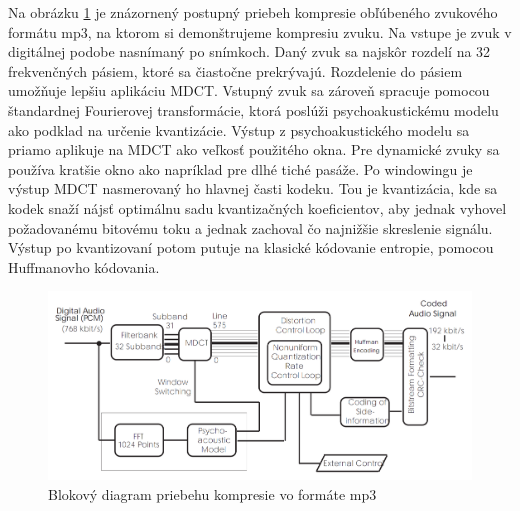 Na obrázku \ref{fig:mp3_flow_diagram} je znázornený postupný priebeh
kompresie obľúbeného zvukového formátu mp3, na ktorom si demonštrujeme
kompresiu zvuku. Na vstupe je zvuk v digitálnej podobe nasnímaný po
snímkoch. Daný zvuk sa najskôr rozdelí na 32 frekvenčných pásiem,
ktoré sa čiastočne prekrývajú. Rozdelenie do pásiem umožňuje lepšiu
aplikáciu MDCT. Vstupný zvuk sa zároveň spracuje pomocou štandardnej
Fourierovej transformácie, ktorá poslúži psychoakustickému modelu ako
podklad na určenie kvantizácie. Výstup z psychoakustického modelu sa
priamo aplikuje na MDCT ako veľkosť použitého okna. Pre dynamické
zvuky sa používa kratšie okno ako napríklad pre dlhé tiché pasáže.
Po windowingu je výstup MDCT nasmerovaný ho hlavnej časti kodeku.
Tou je kvantizácia, kde sa kodek snaží nájsť optimálnu sadu
kvantizačných koeficientov, aby jednak vyhovel požadovanému bitovému
toku a jednak zachoval čo najnižšie skreslenie signálu. Výstup po
kvantizovaní potom putuje na klasické kódovanie entropie, pomocou
Huffmanovho kódovania.

\begin{figure}[htp]
    \centering
    \includegraphics{obrazky/informatika/audio/mp3_flow_diagram}
    \caption{Blokový diagram priebehu kompresie vo formáte mp3}
    \label{fig:mp3_flow_diagram}
\end{figure}

